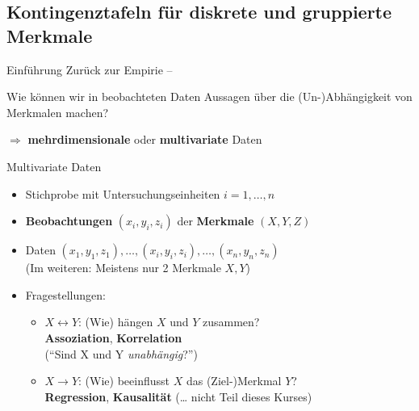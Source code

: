 \documentclass[
  10pt,
  ignorenonframetext,
]{beamer}
\providecommand{\tightlist}{%
  \setlength{\itemsep}{0pt}\setlength{\parskip}{0pt}}
\begin{document}
\subsection{Kontingenztafeln für diskrete und gruppierte
Merkmale}\label{kontingenztafeln-fuxfcr-diskrete-und-gruppierte-merkmale}

\begin{frame}{Einführung}
\label{einfuxfchrung-1}
Zurück zur Empirie --

Wie können wir in beobachteten Daten Aussagen über die (Un-)Abhängigkeit
von Merkmalen machen?

\(\Rightarrow\) \textbf{mehrdimensionale} oder \textbf{multivariate}
Daten
\end{frame}

\begin{frame}{Multivariate Daten}
\label{multivariate-daten}
\begin{itemize}
\tightlist
\item
  Stichprobe mit Untersuchungseinheiten \(i = 1, \dots, n\)
\item
  \textbf{Beobachtungen} \((x_i,y_i,z_i)\) der \textbf{Merkmale}
  \((X,Y,Z)\)
\item
  Daten \((x_1,y_1,z_1),\ldots,(x_i,y_i,z_i),\ldots,(x_n,y_n,z_n)\)\\
  (Im weiteren: Meistens nur 2 Merkmale \(X, Y\))
\item
  Fragestellungen:

  \begin{itemize}
  \tightlist
  \item
    \(X \leftrightarrow Y\): (Wie) hängen \(X\) und \(Y\) zusammen?\\
    \textbf{Assoziation}, \textbf{Korrelation}\\
    (``Sind X und Y \emph{unabhängig}?'')
  \item
    \(X \rightarrow Y\): (Wie) beeinflusst \(X\) das (Ziel-)Merkmal
    \(Y\)?\\
    \textbf{Regression}, \textbf{Kausalität} (\ldots{} nicht Teil dieses
    Kurses)
  \end{itemize}
\end{itemize}
\end{frame}
\end{document}
